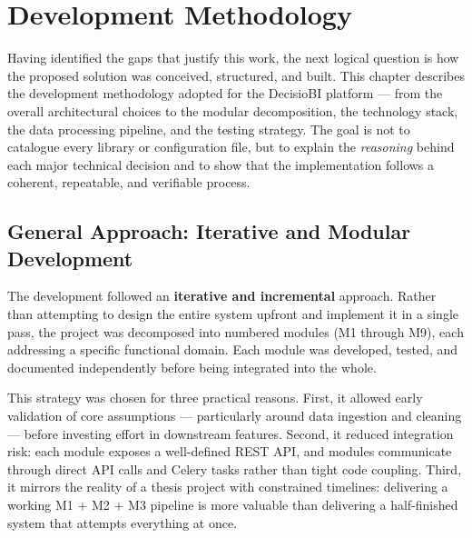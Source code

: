 
\chapter{Development Methodology}


\noindent
Having identified the gaps that justify this work,
the next logical question is how the proposed solution
was conceived, structured, and built.
This chapter describes the development methodology adopted
for the DecisioBI platform — from the overall architectural
choices to the modular decomposition, the technology stack,
the data processing pipeline, and the testing strategy.
The goal is not to catalogue every library or configuration file,
but to explain the \emph{reasoning} behind each major technical decision
and to show that the implementation follows a coherent,
repeatable, and verifiable process.


\section{General Approach: Iterative and Modular Development}

\noindent
The development followed an \textbf{iterative and incremental}
approach. Rather than attempting to design the entire system
upfront and implement it in a single pass, the project was
decomposed into numbered modules (M1 through M9),
each addressing a specific functional domain.
Each module was developed, tested, and documented independently
before being integrated into the whole.

\vspace{0.4cm}
\noindent
This strategy was chosen for three practical reasons.
First, it allowed early validation of core assumptions —
particularly around data ingestion and cleaning —
before investing effort in downstream features.
Second, it reduced integration risk: each module
exposes a well-defined REST API, and modules communicate
through direct API calls and Celery tasks rather than
tight code coupling. Third, it mirrors the reality
of a thesis project with constrained timelines:
delivering a working M1 + M2 + M3 pipeline
is more valuable than delivering a half-finished
system that attempts everything at once.


